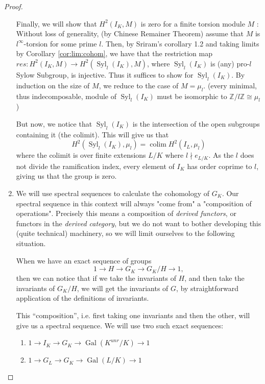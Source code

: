 \documentclass[a4paper]{article}
\newcommand{\isom}{\cong}
\newcommand{\colim}{\operatorname{colim}}
\newcommand{\Syl}{\operatorname{Syl}}
\newcommand{\Gal}{\operatorname{Gal}}
\begin{document}
\begin{proof}
\begin{enumerate}[(1)]
			Finally, we will show that \(H^{2}(I_{K},M)\) is zero 
			for a finite torsion module \(M\) :
			Without loss of generality, (by Chinese Remainer Theorem)
			assume that \(M\) is \(l^{\infty}\)-torsion for some prime 
			\(l\).
			Then, by Sriram's corollary 1.2 and taking limits by
			Corollary \ref{cor:lim:cohom}, we have that the restriction
			map \(res : H^{2}(I_{K},M) \to H^{2}(\Syl_{l}(I_{K}),M)\),
			where \(\Syl_{l}(I_{K})\) is (any) pro-\(l\) Sylow Subgroup,
			is injective. 
			Thus it suffices to show for \(\Syl_{l}\left( I_{K} \right)\).
			By induction on the size of \(M\), we reduce to the case of
			\(M = \mu_{l}\).
			(every minimal, thus indecomposable, module of 
			\(\Syl_{l}(I_{K})\) must be isomorphic to
			\(\mathbb{Z} / l\mathbb{Z} \isom \mu_{l}\))

			But now, we notice that \(\Syl_{l}(I_{K})\) is the intersection
			of the open subgroups containing it (the colimit). 
			This will give us that
			\[
				H^{2}(\Syl_{l}(I_{K}),\mu_{l}) = 
				\colim H^{2}\left( I_{L},\mu_{l} \right)
			\] 
			where the colimit is over finite extensions \(L / K\) where
			\(l \nmid e_{L / K}\).
			As the \(l\) does not divide the ramification index, every
			element of \(I_{K}\) has order coprime to \(l\), giving us that 
			the group is zero.

		\item
			We will use spectral sequences to calculate the cohomology
			of \(G_{K}\). 
			Our spectral sequence in this context will always "come from"
			a "composition of operations".
			Precisely this means a composition of \textit{derived functors},
			or functors in the \textit{derived category}, but we do
			not want to bother developing this (quite technical)
			machinery, so we will limit ourselves to the following situation.

			When we have an exact sequence of groups
			\[
			1 \to H \to G_{K} \to G_{K} / H \to 1	
			,\] 
			then we can notice that if we take the invariants of \(H\), and
			then take the invariants of \(G_{K} / H\), we will get
			the invariants of \(G\), by straightforward application of
			the definitions of invariants.

			This ``composition'', i.e. first taking one invariants and 
			then the other, will give us a spectral sequence.
			We will use two such exact sequences:
			\begin{enumerate}[(1)]
				\item \(1 \to I_{K} \to G_{K} \to \Gal(K^{unr} / K) \to 1\) 
				\item \(1 \to G_{L} \to G_{K} \to \Gal\left( L / K \right) \to 1\) 


\end{enumerate}
\end{enumerate}
\end{proof}
\end{document}
